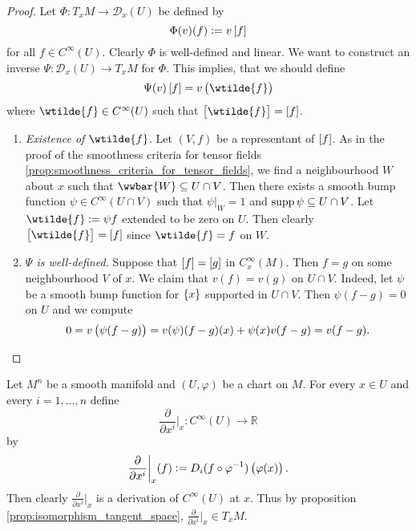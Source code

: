 \begin{proof}
	Let $\Phi : T_xM \to \mathcal{D}_x(U)$ be defined by
	\begin{equation*}
		\Phi(v)(f) := v\sbr[0]{f}
	\end{equation*}
	\noindent for all $f \in C^\infty(U)$. Clearly $\Phi$ is well-defined and linear. We want to construct an inverse $\Psi : \mathcal{D}_x(U) \to T_xM$ for $\Phi$. This implies, that we should define
	\begin{equation*}
		\Psi(v)\sbr[0]{f} = v\del[1]{\wtilde{f}}
	\end{equation*}
	\noindent where $\wtilde{f} \in C^\infty(U)$ such that $\sbr[1]{\wtilde{f}} = \sbr[0]{f}$. 
	\begin{enumerate}[label=\textit{Step \arabic*:},leftmargin=*,wide=0pt]
		\item \textit{Existence of $\wtilde{f}$.} Let $(V,f)$ be a representant of $\sbr[0]{f}$. As in the proof of the smoothness criteria for tensor fields \ref{prop:smoothness_criteria_for_tensor_fields}, we find a neighbourhood $W$ about $x$ such that $\wwbar{W} \subseteq U \cap V$. Then there exists a smooth bump function $\psi \in C^\infty(U \cap V)$ such that $\psi\vert_W = 1$ and $\operatorname{supp} \psi \subseteq U\cap V$. Let $\wtilde{f} := \psi f$ extended to be zero on $U$. Then clearly $\sbr[1]{\wtilde{f}} = \sbr[0]{f}$ since $\wtilde{f} = f$ on $W$.
		\item \textit{$\Psi$ is well-defined.} Suppose that $\sbr[0]{f} = \sbr[0]{g}$ in $C_x^\infty(M)$. Then $f = g$ on some neighbourhood $V$ of $x$. We claim that $v(f) = v(g)$ on $U \cap V$. Indeed, let $\psi$ be a smooth bump function for $\cbr{x}$ supported in $U \cap V$. Then $\psi(f - g) = 0$ on $U$ and we compute
			\begin{equation*}
				0 = v\del[1]{\psi(f - g)} = v(\psi)(f - g)(x) + \psi(x)v(f - g) = v(f - g).
			\end{equation*}
	\end{enumerate}
\end{proof}

\begin{example}
	Let $M^n$ be a smooth manifold and $(U,\varphi)$ be a chart on $M$. For every $x \in U$ and every $i = 1,\dots,n$ define 
	\begin{equation*}
		\frac{\partial}{\partial x^i}\bigg\vert_x : C^\infty(U) \to \mathbb{R}
	\end{equation*}
	\noindent by
	\begin{equation*}
		\frac{\partial}{\partial x^i}\bigg\vert_x(f) := D_i(f \circ \varphi^{-1})\del[1]{\varphi(x)}.
	\end{equation*}
	Then clearly $\frac{\partial}{\partial x^i}\big\vert_x$ is a derivation of $C^\infty(U)$ at $x$. Thus by proposition \ref{prop:isomorphism_tangent_space}, $\frac{\partial}{\partial x^i}\big\vert_x \in T_xM$. 
\end{example}

